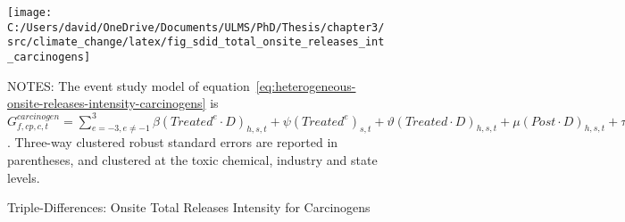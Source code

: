 \begin{figure}[H]
    \centering
    \texttt{[image: C:/Users/david/OneDrive/Documents/ULMS/PhD/Thesis/chapter3/src/climate\_change/latex/fig\_sdid\_total\_onsite\_releases\_int\_carcinogens]}
    \caption{Triple-Differences: Onsite Total Releases Intensity for Carcinogens}
    \label{fig:heterogeneous-onsite-releases-intensity-carcinogens}
    \begin{minipage}{\columnwidth}
        \vspace{0.05in}
        \tiny NOTES: The event study model of equation~\ref{eq:heterogeneous-onsite-releases-intensity-carcinogens} is $G_{f,cp,c,t}^{carcinogen} = \sum_{{e = -3},{e \neq -1}}^{3} \beta (Treated^{e} \cdot D)_{h,s,t} + \psi (Treated^{e})_{s,t} + \vartheta (Treated \cdot D)_{h,s,t} + \mu (Post \cdot D)_{h,s,t} + \tau Treated_{s,t} + \rho D_{h,s,t} + \alpha Post_{t} + \delta X_{v,c,t-1} + \omega F_{f,t} + \lambda_{t} + \gamma_{f} + \phi_{cp} + \zeta_{c} + \eta_{c,t} + \theta_{cp,t} + \varepsilon_{f,cp,c,t}$. Three-way clustered robust standard errors are reported in parentheses, and clustered at the toxic chemical, industry and state levels.
    \end{minipage}
\end{figure}